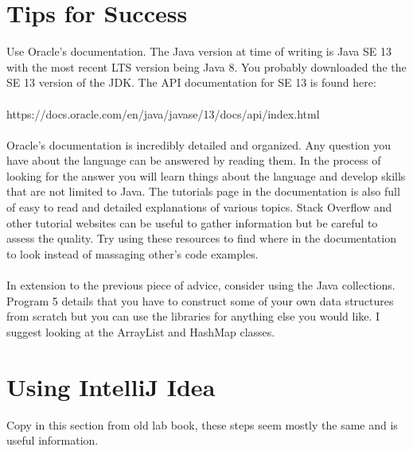 \documentclass{article}
\begin{document}
\section{Tips for Success}
Use Oracle's documentation. The Java version at time of writing is Java SE 13 with the most recent LTS version being Java 8.
You probably downloaded the the SE 13 version of the JDK. The API documentation for SE 13 is found here:
\\\\
https://docs.oracle.com/en/java/javase/13/docs/api/index.html
\\\\
Oracle's documentation is incredibly detailed and organized. Any question you have about the language can be answered by
reading them. In the process of looking for the answer you will learn things about the language and develop skills that are not
limited to Java. The tutorials page in the documentation is also full of easy to read and detailed explanations of various topics.
Stack Overflow and other tutorial websites can be useful to gather information but be careful to assess the quality. Try using
these resources to find where in the documentation to look instead of massaging other's code examples.
\\\\
In extension to the previous piece of advice, consider using the Java collections. Program 5 details that you have to construct
some of your own data structures from scratch but you can use the libraries for anything else you would like. I suggest looking
at the ArrayList and HashMap classes.

\section{Using IntelliJ Idea}
Copy in this section from old lab book, these steps seem mostly the same and is useful information.
\end{document}
